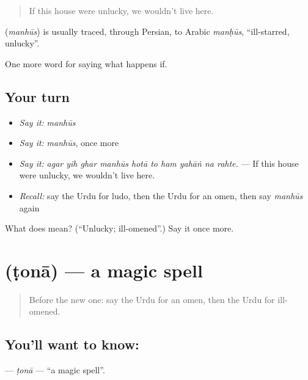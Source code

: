 \begin{quote}
If this house were unlucky, we wouldn't live here.
\end{quote}

\begin{cousinweb}
\textbf{} (\emph{manhūs}) is usually traced, through Persian, to Arabic \emph{manḥūs}, \textquotedblleft{}ill-starred, unlucky\textquotedblright{}.
\end{cousinweb}

\begin{grammarlens}[title={What you've built}]
One more word for saying what happens if.
\end{grammarlens}

\subsection*{Your turn}
\begin{itemize}
\raggedright
  \item \emph{Say it:} \emph{manhūs}
  \item \emph{Say it:} \emph{manhūs}, once more
  \item \emph{Say it:} \emph{agar yih ghar manhūs hotā to ham yahāṅ na rahte.} — If this house were unlucky, we wouldn't live here.
  \item \emph{Recall:} say the Urdu for ludo, then the Urdu for an omen, then say \emph{manhūs} again
\end{itemize}

\begin{tcolorbox}[breakable,colback=teal!4,colframe=teal!35!black,title={Before you move on}]
What does  mean? (\textquotedblleft{}Unlucky; ill-omened\textquotedblright{}.) Say it once more.
\end{tcolorbox}
\section[\texorpdfstring{\ur{ٹونا} (ṭonā)}{ٹونا (ṭonā)}]{ (ṭonā) — a magic spell}

\label{lesson:UR-C535-tona}



\begin{quote}
Before the new one: say the Urdu for an omen, then the Urdu for ill-omened.
\end{quote}

\subsection*{You'll want to know: }
\textbf{} — \emph{ṭonā} — \textquotedblleft{}a magic spell\textquotedblright{}.

